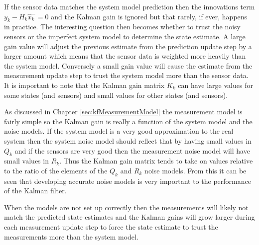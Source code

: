 If the sensor data matches the system model prediction then the innovations term $y_k-H_k\hat{x}_k^-=0$ and the Kalman gain is ignored but that rarely, if ever, happens in practice. The interesting question then becomes whether to trust the noisy sensors or the imperfect system model to determine the state estimate. A large gain value will adjust the previous estimate from the prediction update step by a larger amount which means that the sensor data is weighted more heavily than the system model. Conversely a small gain value will cause the estimate from the measurement update step to trust the system model more than the sensor data. It is important to note that the Kalman gain matrix $K_k$ can have large values for some states (and sensors) and small values for other states (and sensors).

As discussed in Chapter \ref{sec:kfMeasurementModel} the measurement model is fairly simple so the Kalman gain is really a function of the system model and the noise models. If the system model is a very good approximation to the real system then the system noise model should reflect that by having small values in $Q_k$ and if the sensors are very good then the measurement noise model will have small values in $R_k$. Thus the Kalman gain matrix tends to take on values relative to the ratio of the elements of the $Q_k$ and $R_k$ noise models. From this it can be seen that developing accurate noise models is very important to the performance of the Kalman filter.

When the models are not set up correctly then the measurements will likely not match the predicted state estimates and the Kalman gains will grow larger during each measurement update step to force the state estimate to trust the measurements more than the system model.

